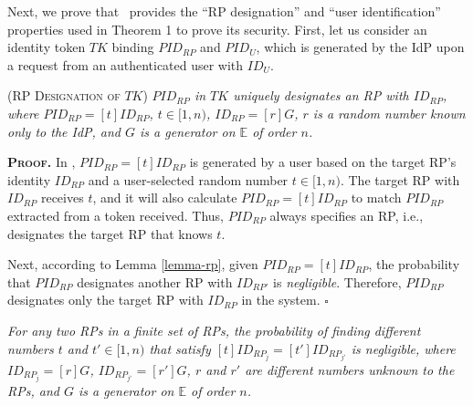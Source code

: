 
Next, we prove that \usso\ provides the ``RP designation'' and ``user identification'' properties used in Theorem 1 to prove its security. First, let us consider an identity token $TK$ binding $PID_{RP}$ and $PID_U$, which is generated by the IdP upon a request from an authenticated user with $ID_U$.

\begin{thm}
\textsc{(RP Designation of $TK$)}  \emph{$PID_{RP}$ in $TK$ uniquely designates an RP with $ID_{RP}$, where $PID_{RP}= [t]ID_{RP}$, $t \in [1,n)$, $ID_{RP} = [r]G$, $r$ is a random number known only to the IdP, and $G$ is a generator on $\mathbb{E}$ of order $n$.}
\label{thm-rp-designation}
\end{thm}


\noindent\textbf{\textsc{Proof.}} In \usso, $PID_{RP}=[t]ID_{RP}$ is generated by a user based on the target RP's identity $ID_{RP}$ and a user-selected random number $t \in [1,n)$.
The target RP with $ID_{RP}$ receives $t$, and it will also calculate $PID_{RP}=[t]ID_{RP}$ to match $PID_{RP}$ extracted from a token received.
Thus, $PID_{RP}$ always specifies an RP, i.e., %
designates the target RP that knows $t$.

Next, according to Lemma \ref{lemma-rp}, given $PID_{RP} = [t]ID_{RP}$, the probability that $PID_{RP}$ designates another RP with $ID_{RP'}$ is \emph{negligible}. %
Therefore, $PID_{RP}$ designates only the target RP with $ID_{RP}$ in the system.  \hfill $\square$


\begin{lemma}
\emph{For any two RPs in a finite set of RPs, the probability of finding different numbers $t$ and $t' \in [1,n)$ that satisfy $[t]ID_{RP_j} = [t']ID_{RP_{j'}}$ is negligible, where $ID_{RP_j}=[r]G$, $ID_{RP_{j'}}=[r']G$, $r$ and $r'$ are different numbers unknown to the RPs, and $G$ is a generator on $\mathbb{E}$ of order $n$.}
\label{lemma-rp}
\end{lemma}



